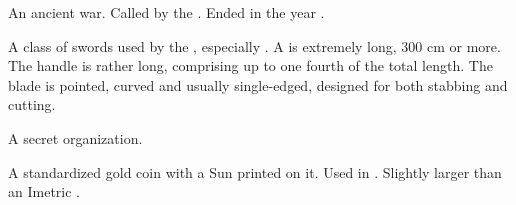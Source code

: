 \begin{gloss}
\begin{comment}
\paragraph{\Secondbanewar}
\end{comment}
\gitem{\Secondbanewar}
An ancient war.
Called  by the \resphain. 
Ended in the year . 







\begin{comment}
\paragraph{\senaan}
\end{comment}
\gitem[\senaan]{\senaan}
A class of swords used by the \resphain, especially \CiriathSepher. 
A \senaan{} is extremely long, 300 cm or more. 
The handle is rather long, comprising up to one fourth of the total length. 
The blade is pointed, curved and usually single-edged, designed for both stabbing and cutting. 







\begin{comment}
\paragraph{Sentinels of \Miith}
\end{comment}
A secret organization. 







\begin{comment}
\paragraph{sun}
\end{comment}
A standardized gold coin with a Sun printed on it. 
Used in \Velcad{}. 
Slightly larger than an Imetric .








\end{gloss}
